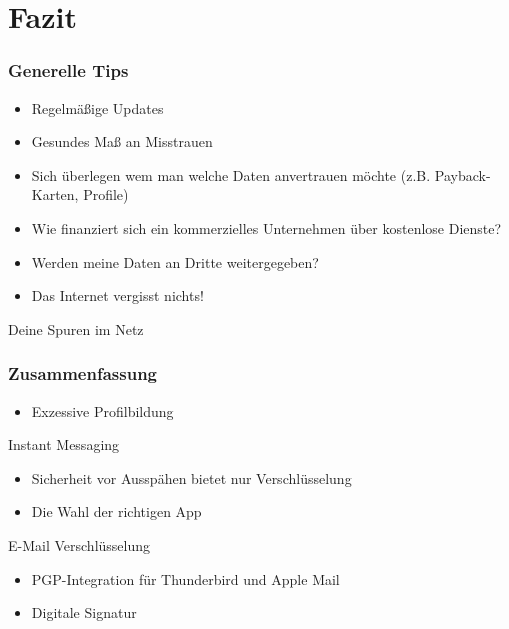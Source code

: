 \section{Fazit}


\begin{frame}
  \frametitle{Generelle Tips}
  \begin{itemize}
   \item Regelmäßige Updates
   \item Gesundes Maß an Misstrauen
   \item Sich überlegen wem man welche Daten anvertrauen möchte (z.B. Payback-Karten, Profile)
   \item Wie finanziert sich ein kommerzielles Unternehmen über kostenlose Dienste?
   \item Werden meine Daten an Dritte weitergegeben?
   \item Das Internet vergisst nichts!
  \end{itemize}
\end{frame}

\begin{frame}
  Deine Spuren im Netz
  \frametitle{Zusammenfassung}
  \begin{itemize}
   \item Exzessive Profilbildung
  \end{itemize}

  Instant Messaging
  \begin{itemize}
   \item Sicherheit vor Ausspähen bietet nur Verschlüsselung
   \item Die Wahl der richtigen App
  \end{itemize}

  E-Mail Verschlüsselung
  \begin{itemize}
   \item PGP-Integration für Thunderbird und Apple Mail
   \item Digitale Signatur
  \end{itemize}

\end{frame}
